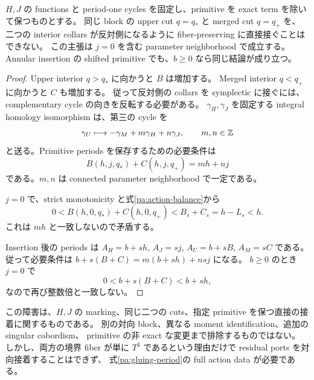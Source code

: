 \begin{theorem}\label{pa:self-gluing}
$H,J$ の functions と period-one cycles を固定し、primitive を exact term を除いて保つものとする。
同じ block の upper cut $q=q_*$ と merged cut $q=q_+$ を、
二つの interior collars が反対側になるように fiber-preserving に直接接ぐことはできない。
この主張は $j=0$ を含む parameter neighborhood で成立する。
Annular insertion の shifted primitive でも、$b\ge0$ なら同じ結論が成り立つ。
\end{theorem}

\begin{proof}
Upper interior $q>q_*$ に向かうと $B$ は増加する。
Merged interior $q<q_+$ に向かうと $C$ も増加する。
従って反対側の collars を symplectic に接ぐには、complementary cycle の向きを反転する必要がある。
$\gamma_H,\gamma_J$ を固定する integral homology isomorphism は、第三の cycle を
\[
 \gamma_U\longmapsto-\gamma_M+m\gamma_H+n\gamma_J,\qquad m,n\in\mathbb Z
\]
と送る。Primitive periods を保存するための必要条件は
\begin{equation}\label{pa:gluing-period}
 B(h,j,q_*)+C(h,j,q_+)=mh+nj
\end{equation}
である。$m,n$ は connected parameter neighborhood で一定である。

$j=0$ で、strict monotonicity と式\eqref{pa:action-balance}から
\[
 0<B(h,0,q_*)+C(h,0,q_+)
  <B_s+C_s=h-L_s<h.
\]
これは $mh$ と一致しないので矛盾する。

Insertion 後の periods は $A_H=b+sh$, $A_J=sj$,
$A_U=b+sB$, $A_M=sC$ である。
従って必要条件は $b+s(B+C)=m(b+sh)+nsj$ になる。
$b\ge0$ のとき $j=0$ で
\[
 0<b+s(B+C)<b+sh,
\]
なので再び整数倍と一致しない。
\end{proof}

この障害は、$H,J$ の marking、同じ二つの cuts、指定 primitive を保つ直接の接着に関するものである。
別の対向 block、異なる moment identification、追加の singular cobordism、
primitive の非 exact な変更まで排除するものではない。
しかし、両方の境界 fiber が単に $T^3$ であるという理由だけで residual ports を対向接着することはできず、
式\eqref{pa:gluing-period}の full action data が必要である。
